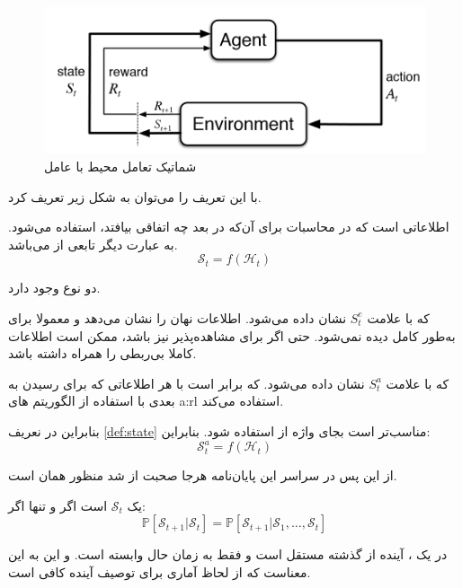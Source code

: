 \begin{figure}[t]
	\centering
	\includegraphics[width=0.7\linewidth]{Figures/RL/Markov-vhain-SARSA}
	\caption{شماتیک تعامل محیط با عامل}
	\label{fig:markov-chain-sarsa}
\end{figure}

با این تعریف  را می‌توان به شکل زیر تعریف کرد.

\begin{definition}\label{def:state}
	\textbf{}
	اطلاعاتی است که در محاسبات برای آن‌که در بعد چه اتفاقی بیافتد، استفاده می‌شود. به عبارت دیگر  تابعی از  می‌باشد.
	\[
	\mathcal{S}_t = f(\mathcal{H}_t)
	\]
\end{definition}

دو نوع  وجود دارد.
\begin{alphabetlist}
	\item \textbf{} که با علامت $S_t^e$ نشان داده می‌شود.
	اطلاعات نهان  را نشان می‌دهد و معمولا برای  به‌طور کامل دیده نمی‌شود. حتی اگر برای  مشاهده‌پذیر نیز باشد، ممکن است اطلاعات کاملا بی‌ربطی را همراه داشته باشد.
	\item \textbf{} که با علامت $S_t^a$ نشان داده می‌شود.
	که برابر است با هر اطلاعاتی که  برای رسیدن به  بعدی با استفاده از الگوریتم های \gls{a:rl} استفاده می‌کند. 
\end{alphabetlist}

بنابراین در نعریف \ref{def:state} مناسب‌تر است بجای واژه  از  استفاده شود. بنابراین:
	\[
	\mathcal{S}_t^a = f(\mathcal{H}_t)
	\]
	
\begin{note}
	از این پس در سراسر این پایان‌نامه هرجا صحبت از  شد منظور همان  است.
\end{note}
	
\begin{definition}
	یک 
	$\mathcal{S}_t$
	است اگر و تنها اگر:
	$$
		\mathbb{P}\left[\mathcal{S}_{t+1} | \mathcal{S}_{t}\right]=\mathbb{P}\left[\mathcal{S}_{t+1} | \mathcal{S}_{1}, \ldots, \mathcal{S}_{t}\right]
	$$
\end{definition}
در یک ، آینده از گذشته مستقل است و فقط به زمان حال وابسته است.
و این به این معناست که  از لحاظ آماری برای توصیف آینده کافی است.

